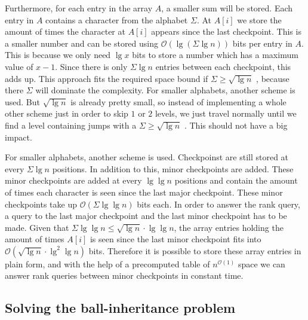 Furthermore, for each entry in the array $A$, a smaller sum will be stored. Each entry in $A$ contains a character from the alphabet $\Sigma$. At $A[i]$ we store the amount of times the character at $A[i]$ appears since the last checkpoint. This is a smaller number and can be stored using $\mathcal{O}(\lg (\Sigma \lg n))$ bits per entry in $A$. This is because we only need $\lg x$ bits to store a number which has a maximum value of $x-1$. Since there is only $\Sigma \lg n$ entries between each checkpoint, this adds up. This approach fits the required space bound if $\Sigma \geq \sqrt{\lg n}$ , because there $\Sigma$ will dominate the complexity. For smaller alphabets, another scheme is used. But $\sqrt{\lg n}$ is already pretty small, so instead of implementing a whole other scheme just in order to skip $1$ or $2$ levels, we just travel normally until we find a level containing jumps with a $\Sigma \geq \sqrt{\lg n}$ . This should not have a big impact. 

For smaller alphabets, another scheme is used. Checkpoinst are still stored at every $\Sigma \lg n$ positions. In addition to this, minor checkpoints are added. These minor checkpoints are added at every $\lg \lg n$ positions and contain the amount of times each character is seen since the last major checkpoint. These minor checkpoints take up $\mathcal{O}(\Sigma \lg \lg n)$ bits each. In order to answer the rank query, a query to the last major checkpoint and the last minor checkpoint has to be made. Given that $\Sigma \lg \lg n \leq \sqrt{\lg n} \cdot \lg \lg n$, the array entries holding the amount of times $A[i]$ is seen since the last minor checkpoint fits into $\mathcal{O}(\sqrt{\lg n} \cdot \lg^2 \lg n)$ bits. Therefore it is possible to store these array entries in plain form, and with the help of a precomputed table of $n^{\mathcal{O}(1)}$ space we can answer rank queries between minor checkpoints in constant time.   


\subsection{Solving the ball-inheritance problem} 
\label{ssection:solving-ball}

